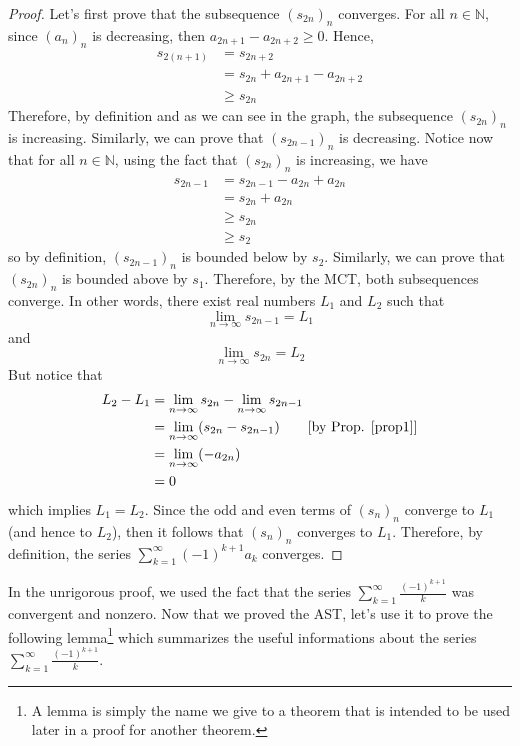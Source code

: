 \documentclass[12pt]{article}
\newcommand{\N}{\mathbb{N}}
\theoremstyle{definition}
\newcounter{prop}[section]
\begin{document}
\begin{proof}
    Let's first prove that the subsequence $(s_{2n})_n$ converges. For all $n \in \N$, since $(a_n)_n$ is decreasing, then $a_{2n+1} - a_{2n+2} \geq 0$. Hence,
    \begin{align*}
        s_{2(n+1)} &= s_{2n + 2} \\
        &= s_{2n} + a_{2n+1} - a_{2n+2} \\
        &\geq s_{2n}
    \end{align*}
    Therefore, by definition and as we can see in the graph, the subsequence $(s_{2n})_n$ is increasing. Similarly, we can prove that $(s_{2n-1})_n$ is decreasing. Notice now that for all $n \in \N$, using the fact that $(s_{2n})_n$ is increasing, we have
    \begin{align*}
        s_{2n-1} &= s_{2n-1} - a_{2n} + a_{2n} \\
        &= s_{2n} + a_{2n} \\
        &\geq s_{2n} \\
        &\geq s_2
    \end{align*}
    so by definition, $(s_{2n-1})_n$ is bounded below by $s_2$. Similarly, we can prove that $(s_{2n})_n$ is bounded above by $s_1$. Therefore, by the MCT, both subsequences converge. In other words, there exist real numbers $L_1$ and $L_2$ such that
    $$\lim_{n \rightarrow \infty}s_{2n-1} = L_1$$
    and
    $$\lim_{n \rightarrow \infty}s_{2n} = L_2$$
    But notice that
    \begin{align*}
        L_2 - L_1 &= \lim_{n \rightarrow \infty}s_{2n} - \lim_{n \rightarrow \infty}s_{2n-1} \\
        &= \lim_{n \rightarrow \infty} (s_{2n} - s_{2n-1}) \tag*{[by Prop. \ref{prop1}]}\\
        &= \lim_{n \rightarrow \infty} (-a_{2n}) \\
        &= 0
    \end{align*}
    which implies $L_1 = L_2$. Since the odd and even terms of $(s_n)_n$ converge to $L_1$ (and hence to $L_2$), then it follows that $(s_n)_n$ converges to $L_1$. Therefore, by definition, the series $\sum_{k=1}^{\infty}(-1)^{k+1}a_k$ converges.
\end{proof}

In the unrigorous proof, we used the fact that the series $\sum_{k=1}^{\infty}\frac{(-1)^{k+1}}{k}$ was convergent and nonzero. Now that we proved the AST, let's use it to prove the following lemma\footnote{A lemma is simply the name we give to a theorem that is intended to be used later in a proof for another theorem.} which summarizes the useful informations about the series $\sum_{k=1}^{\infty}\frac{(-1)^{k+1}}{k}$.
\end{document}
